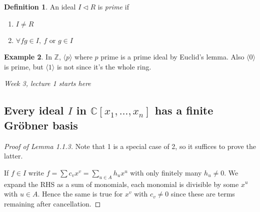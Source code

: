 \documentclass[a4paper]{article}
\theoremstyle{definition}
\newtheorem{defn}{Definition}[subsection]
\newtheorem{example}[defn]{Example}
\begin{document}
\begin{defn}
An ideal $I\lhd R$ is \textit{prime} if
\begin{enumerate}
\item $I\neq R$
\item $\forall fg\in I,\ f$ or $g\in I$
\end{enumerate}
\end{defn}
\begin{example}
In $\mathbb Z$, $\langle p\rangle$ where $p$ prime is a prime ideal by Euclid's lemma. Also $\langle 0\rangle$ is prime, but $\langle 1\rangle$ is not since it's the whole ring.
\end{example}

\begin{flushright}
\textit{Week 3, lecture 1 starts here}
\end{flushright}

\subsection{Every ideal $I$ in $\mathbb C[x_1,\ldots,x_n]$ has a finite Gröbner basis}

\begin{proof}[Proof of Lemma 1.1.3]
Note that 1 is a special case of 2, so it suffices to prove the latter.

If $f\in I$ write $f=\sum c_v x^v = \sum_{u\in A} h_u x^u$ with only finitely many $h_u\neq 0$. We expand the RHS as a sum of monomials, each monomial is divisible by some $x^u$ with $u\in A$. Hence the same is true for $x^v$ with $c_v\neq 0$ since these are terms remaining after cancellation.
\end{proof}
\end{document}
